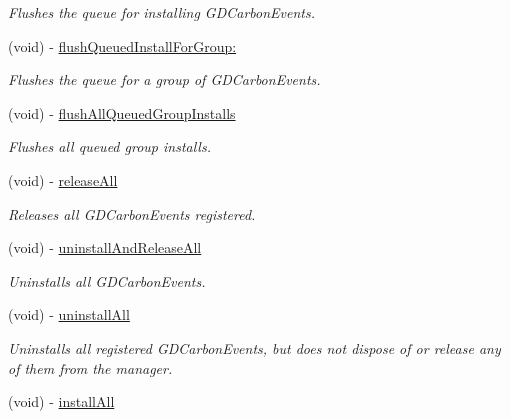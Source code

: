 \begin{DoxyCompactItemize}
\begin{DoxyCompactList}\small\item\em Flushes the queue for installing GDCarbonEvents. \item\end{DoxyCompactList}\item 
(void) -\/ \hyperlink{interface_g_d_carbon_event_manager_a88f2451e02706edb8034b946d6bc25be}{flushQueuedInstallForGroup:}
\begin{DoxyCompactList}\small\item\em Flushes the queue for a group of GDCarbonEvents. \item\end{DoxyCompactList}\item 
\hypertarget{interface_g_d_carbon_event_manager_ac303f0701a16d99b7f2d901a557e91da}{
(void) -\/ \hyperlink{interface_g_d_carbon_event_manager_ac303f0701a16d99b7f2d901a557e91da}{flushAllQueuedGroupInstalls}}
\label{interface_g_d_carbon_event_manager_ac303f0701a16d99b7f2d901a557e91da}

\begin{DoxyCompactList}\small\item\em Flushes all queued group installs. \item\end{DoxyCompactList}\item 
(void) -\/ \hyperlink{interface_g_d_carbon_event_manager_a02ef933692cbd8d55d8ddff9e1729040}{releaseAll}
\begin{DoxyCompactList}\small\item\em Releases all GDCarbonEvents registered. \item\end{DoxyCompactList}\item 
(void) -\/ \hyperlink{interface_g_d_carbon_event_manager_ab4b42a2fa05a8c48d8d99733f265d2c6}{uninstallAndReleaseAll}
\begin{DoxyCompactList}\small\item\em Uninstalls all GDCarbonEvents. \item\end{DoxyCompactList}\item 
\hypertarget{interface_g_d_carbon_event_manager_a93216262ded2fae014a25d010271b4b2}{
(void) -\/ \hyperlink{interface_g_d_carbon_event_manager_a93216262ded2fae014a25d010271b4b2}{uninstallAll}}
\label{interface_g_d_carbon_event_manager_a93216262ded2fae014a25d010271b4b2}

\begin{DoxyCompactList}\small\item\em Uninstalls all registered GDCarbonEvents, but does not dispose of or release any of them from the manager. \item\end{DoxyCompactList}\item 
\hypertarget{interface_g_d_carbon_event_manager_abf0b5fb6eee060a130cfef0bad396e66}{
(void) -\/ \hyperlink{interface_g_d_carbon_event_manager_abf0b5fb6eee060a130cfef0bad396e66}{installAll}}
\label{interface_g_d_carbon_event_manager_abf0b5fb6eee060a130cfef0bad396e66}


\end{DoxyCompactItemize}
